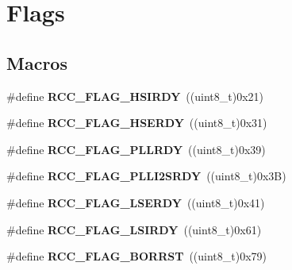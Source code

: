 \hypertarget{group___r_c_c___flag}{}\section{Flags}
\label{group___r_c_c___flag}
\subsection*{Macros}
\begin{DoxyCompactItemize}
\item 
\#define {\bfseries R\+C\+C\+\_\+\+F\+L\+A\+G\+\_\+\+H\+S\+I\+R\+DY}~((uint8\+\_\+t)0x21)\hypertarget{group___r_c_c___flag_ga827d986723e7ce652fa733bb8184d216}{}\label{group___r_c_c___flag_ga827d986723e7ce652fa733bb8184d216}

\item 
\#define {\bfseries R\+C\+C\+\_\+\+F\+L\+A\+G\+\_\+\+H\+S\+E\+R\+DY}~((uint8\+\_\+t)0x31)\hypertarget{group___r_c_c___flag_ga173edf47bec93cf269a0e8d0fec9997c}{}\label{group___r_c_c___flag_ga173edf47bec93cf269a0e8d0fec9997c}

\item 
\#define {\bfseries R\+C\+C\+\_\+\+F\+L\+A\+G\+\_\+\+P\+L\+L\+R\+DY}~((uint8\+\_\+t)0x39)\hypertarget{group___r_c_c___flag_gaf82d8afb18d9df75db1d6c08b9c50046}{}\label{group___r_c_c___flag_gaf82d8afb18d9df75db1d6c08b9c50046}

\item 
\#define {\bfseries R\+C\+C\+\_\+\+F\+L\+A\+G\+\_\+\+P\+L\+L\+I2\+S\+R\+DY}~((uint8\+\_\+t)0x3\+B)\hypertarget{group___r_c_c___flag_ga31e67a9f19cf673acf196d19f443f3d5}{}\label{group___r_c_c___flag_ga31e67a9f19cf673acf196d19f443f3d5}

\item 
\#define {\bfseries R\+C\+C\+\_\+\+F\+L\+A\+G\+\_\+\+L\+S\+E\+R\+DY}~((uint8\+\_\+t)0x41)\hypertarget{group___r_c_c___flag_gac9fb963db446c16e46a18908f7fe1927}{}\label{group___r_c_c___flag_gac9fb963db446c16e46a18908f7fe1927}

\item 
\#define {\bfseries R\+C\+C\+\_\+\+F\+L\+A\+G\+\_\+\+L\+S\+I\+R\+DY}~((uint8\+\_\+t)0x61)\hypertarget{group___r_c_c___flag_ga8c5e4992314d347597621bfe7ab10d72}{}\label{group___r_c_c___flag_ga8c5e4992314d347597621bfe7ab10d72}

\item 
\#define {\bfseries R\+C\+C\+\_\+\+F\+L\+A\+G\+\_\+\+B\+O\+R\+R\+ST}~((uint8\+\_\+t)0x79)\hypertarget{group___r_c_c___flag_ga23d5211abcdf0e397442ca534ca04bb4}{}\label{group___r_c_c___flag_ga23d5211abcdf0e397442ca534ca04bb4}


\end{DoxyCompactItemize}
